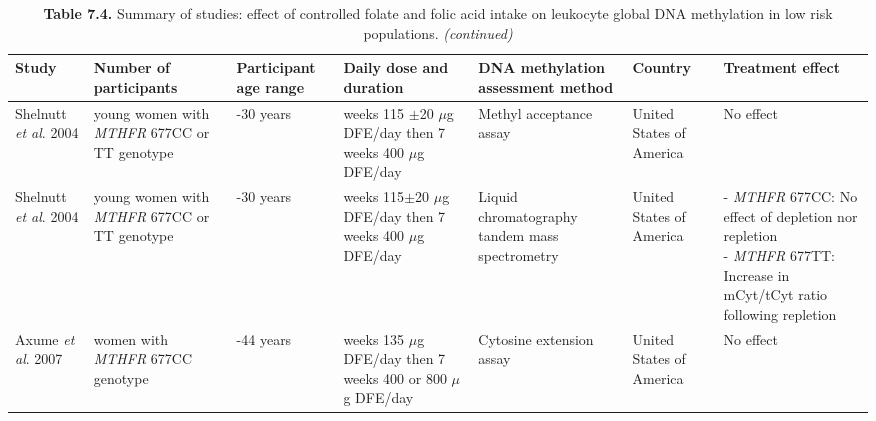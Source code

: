 \begin{sidewaystable}
\footnotesize
\caption*{\textbf{Table 7.4.} Summary of studies: effect of controlled folate and folic acid intake on leukocyte global DNA methylation in low risk populations. \emph{(continued)}}
\begin{tabular}{L{1.6cm}C{2cm}C{1.7cm}C{2.3cm}C{2.5cm}C{1.6cm}C{3.4cm}}
\hline\bfseries Study & \bfseries Number of participants & \bfseries Participant age range & \bfseries Daily dose and duration & \bfseries DNA methylation assessment
method & \bfseries Country & \bfseries Treatment effect\\
\hline
\parbox[t][3.3cm]{1.6cm}{\raggedright Shelnutt \emph{et al}. 2004 \cite{c75}} &
\parbox[t][3.3cm]{2cm}{ young women with \textit{MTHFR} 677CC or TT genotype} &
\parbox[t][3.3cm]{1.7cm}{-30 years} &
\parbox[t][3.3cm]{2.3cm}{ weeks 115 \textrm{${\pm}$}20 $\mu$g DFE/day then 7 weeks 400 $\mu$g DFE/day} &
\parbox[t][3.3cm]{2.5cm}{\centering Methyl acceptance assay} &
\parbox[t][3.3cm]{1.6cm}{\centering United States of America} &
\parbox[t][3.3cm]{3.4cm}{\centering No effect}\\

\parbox[t][3.2cm]{1.6cm}{\raggedright Shelnutt \emph{et al}. 2004 \cite{c75}} &
\parbox[t][3.2cm]{2cm}{ young women with \textit{MTHFR} 677CC or TT genotype} &
\parbox[t][3.2cm]{1.7cm}{-30 years} &
\parbox[t][3.2cm]{2.3cm}{ weeks 115\textrm{${\pm}$}20 $\mu$g DFE/day then 7 weeks 400 $\mu$g DFE/day} &
\parbox[t][3.2cm]{2.5cm}{\centering Liquid chromatography tandem mass spectrometry} &
\parbox[t][3.2cm]{1.6cm}{\centering United States of America} &
\parbox[t][3.2cm]{3.4cm}{\centering - \emph{MTHFR} 677CC: No effect of depletion nor repletion \\ - \emph{MTHFR} 677TT:  Increase in mCyt/tCyt ratio following repletion}\\

\parbox[t][2.3cm]{1.6cm}{\raggedright Axume \emph{et al}. 2007 \cite{c799}} &
\parbox[t][2.3cm]{2cm}{ women with \textit{MTHFR} 677CC genotype} &
\parbox[t][2.3cm]{1.7cm}{-44 years} &
\parbox[t][2.3cm]{2.3cm}{ weeks 135 $\mu$g DFE/day then 7 weeks 400 or 800 $\mu$g DFE/day} &
\parbox[t][2.3cm]{2.5cm}{\centering Cytosine extension assay} &
\parbox[t][2.3cm]{1.6cm}{\centering United States of America} &
\parbox[t][2.3cm]{3.4cm}{\centering No effect}\\
\hline
\end{tabular}
\end{sidewaystable}


